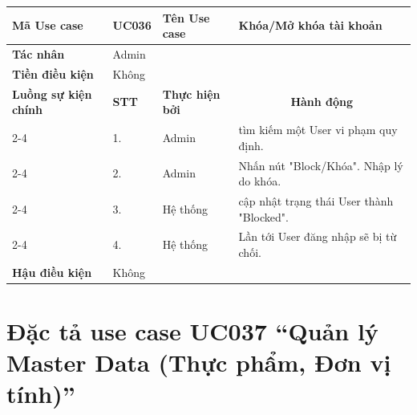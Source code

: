 \begin{longtable}{|p{2.7cm}|p{0.8cm}|p{2.6cm}|p{7.3cm}|}
\hline
\cellcolor[HTML]{D5F5E3}\textbf{Mã Use case} & \multicolumn{1}{l|}{UC036} & \cellcolor[HTML]{D5F5E3}\textbf{Tên Use case} & Khóa/Mở khóa tài khoản \\ \hline
\cellcolor[HTML]{D5F5E3}\textbf{Tác nhân} & \multicolumn{3}{p{10.7cm}|}{Admin} \\ \hline
\cellcolor[HTML]{D5F5E3}\textbf{Tiền điều kiện} & \multicolumn{3}{p{10.7cm}|}{Không} \\ \hline

\cellcolor[HTML]{D5F5E3}\textbf{Luồng sự kiện chính} & \cellcolor[HTML]{FDEBD0}\textbf{STT} & \cellcolor[HTML]{FDEBD0}\textbf{Thực hiện bởi} & \multicolumn{1}{c|}{\cellcolor[HTML]{FDEBD0}\textbf{Hành động}} \\ \cline{2-4} 
\cellcolor[HTML]{D5F5E3} & 1. & Admin & tìm kiếm một User vi phạm quy định. \\ \cline{2-4} 
\cellcolor[HTML]{D5F5E3} & 2. & Admin & Nhấn nút "Block/Khóa". Nhập lý do khóa. \\ \cline{2-4} 
\cellcolor[HTML]{D5F5E3} & 3. & Hệ thống & cập nhật trạng thái User thành "Blocked". \\ \cline{2-4} 
\cellcolor[HTML]{D5F5E3} & 4. & Hệ thống & Lần tới User đăng nhập sẽ bị từ chối. \\ \hline

\cellcolor[HTML]{D5F5E3}\textbf{Hậu điều kiện} & \multicolumn{3}{p{10.7cm}|}{Không} \\ \hline
\end{longtable}
\endgroup

\section{Đặc tả use case UC037 ``Quản lý Master Data (Thực phẩm, Đơn vị tính)''}
\vspace{0.5cm}

\begingroup
\renewcommand{\arraystretch}{1.5}

